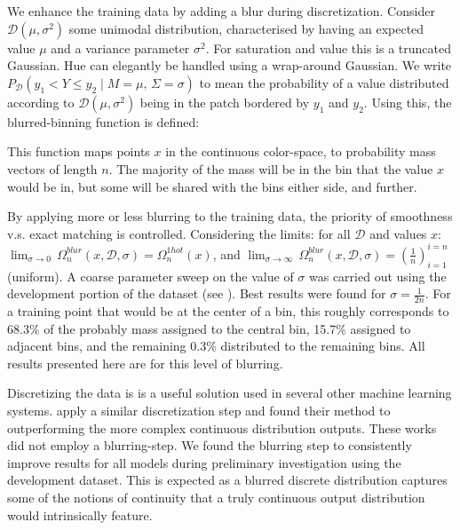 \documentclass[11pt,a4paper]{article}
\newcommand{\compactmath}[1]{\noindent\resizebox{\columnwidth}{!}{$#1$}}
\newcommand{\textcite}{\citet}
\begin{document}
We enhance the training data by adding a blur during discretization.
Consider $\mathcal{D}(\mu,\sigma^{2})$ some unimodal distribution, characterised by having an expected value $\mu$ and a variance parameter $\sigma^{2}$.
For saturation and value this is a truncated Gaussian.
Hue can elegantly be handled using a wrap-around Gaussian.
We write $P_{\mathcal{D}}(y_{1}{<}Y{\le} y_{2}\mid M{=}\mu,\,\Sigma=\sigma)$ to mean the probability of a value distributed according to $\mathcal{D}(\mu,\sigma^{2})$ being in the patch bordered by $y_1$ and $y_2$.
Using this, the blurred-binning function is defined: 

\compactmath{\Omega_{n}^{blur}(x,\mathcal{D},\sigma)=\left(P_{\mathcal{D}}\left(\dfrac{i-1}{n}<Y\le\dfrac{i}{n}\mid M=x,\,\Sigma=\sigma\right)\right)_{i=1}^{i=n}}
This function maps points $x$ in the continuous color-space, to probability mass vectors of length $n$.
The majority of the mass will be in the bin that the value $x$ would be in,
but some will be shared with the bins either side, and further.

By applying more or less blurring to the training data, the priority of smoothness v.s. exact matching is controlled.
Considering the limits:
for all $\mathcal{D}$ and values $x$: 
\mbox{$\lim_{\sigma \to 0}\, \Omega_n^{blur}(x, \mathcal{D}, \sigma) = \Omega_n^{1hot}(x)$},
and \mbox{$\lim_{\sigma \to \infty}\, \Omega_n^{blur}(x, \mathcal{D}, \sigma) =  \left(\frac{1}{n}\right)_{i=1}^{i=n}$} (uniform).
A coarse parameter sweep on the value of $\sigma$ was carried out using the development portion of the dataset (see ).
Best results were found for $\sigma = \frac{1}{2n}$.
For a training point that would be at the center of a bin, this roughly corresponds to 68.3\% of the probably mass assigned to the central bin, 15.7\% assigned to adjacent bins, and the remaining 0.3\% distributed to the remaining bins.
All results presented here are for this level of blurring.

Discretizing the data is is a useful solution used in several other machine learning systems.
\textcite{oord2016pixel, DBLP:journals/corr/OordDZSVGKSK16} apply a similar discretization step and found their method to outperforming the more complex continuous distribution outputs.
These works did not employ a blurring-step.
We found the blurring step to consistently improve results for all models during preliminary investigation using the development dataset.
This is expected as a blurred discrete distribution captures some of the notions of continuity that a truly continuous output distribution would intrinsically feature.
\end{document}
